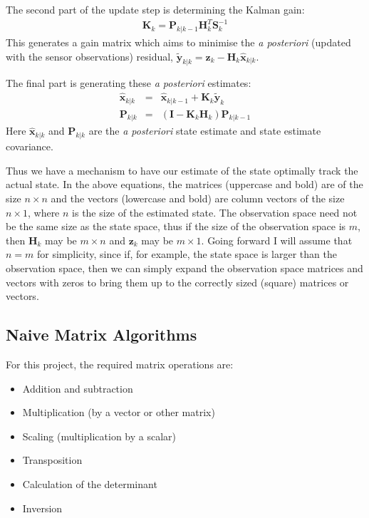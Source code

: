 \documentclass[12pt]{article}
\begin{document}
The second part of the update step is determining the Kalman gain:
\begin{eqnarray}
	\mathbf{K}_k = \mathbf{P}_{k|k-1} \mathbf{H}^T_k \mathbf{S}^{-1}_k
\end{eqnarray}
This generates a gain matrix which aims to minimise the \emph{a posteriori} (updated with the sensor observations) residual, $\mathbf{\tilde{y}}_{k|k} = \mathbf{z}_k - \mathbf{H}_k \mathbf{\hat{x}}_{k|k}$.

The final part is generating these \emph{a posteriori} estimates:
\begin{eqnarray}
	\mathbf{\hat{x}}_{k|k} &=& \mathbf{\hat{x}}_{k|k-1} + \mathbf{K}_k \mathbf{\tilde{y}}_k \\
	\mathbf{P}_{k|k} &=& (\mathbf{I} - \mathbf{K}_k \mathbf{H}_k)\mathbf{P}_{k|k-1}
\end{eqnarray}
Here $\mathbf{\hat{x}}_{k|k}$ and $\mathbf{P}_{k|k}$ are the \emph{a posteriori} state estimate and state estimate covariance.

Thus we have a mechanism to have our estimate of the state optimally track the actual state. In the above equations, the matrices (uppercase and bold) are of the size $n \times n$ and the vectors (lowercase and bold) are column vectors of the size $n \times 1$, where $n$ is the size of the estimated state. The observation space need not be the same size as the state space, thus if the size of the observation space is $m$, then $\mathbf{H}_k$ may be $m \times n$ and $\mathbf{z}_k$ may be $m \times 1$. Going forward I will assume that $n = m$ for simplicity, since if, for example, the state space is larger than the observation space, then we can simply expand the observation space matrices and vectors with zeros to bring them up to the correctly sized (square) matrices or vectors.

\subsection{Naive Matrix Algorithms}
\label{naive}

For this project, the required matrix operations are:

\begin{itemize}
	\item Addition and subtraction
	\item Multiplication (by a vector or other matrix)
	\item Scaling (multiplication by a scalar)
	\item Transposition
	\item Calculation of the determinant
	\item Inversion
\end{itemize}
\end{document}
